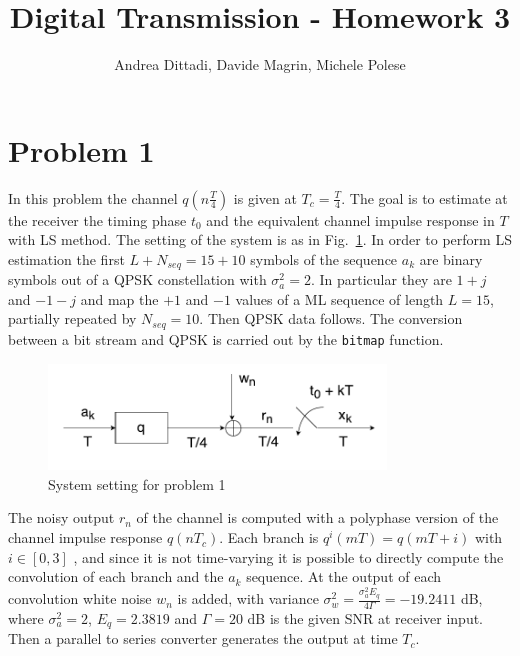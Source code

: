 \documentclass[10pt]{article}
\begin{document}
\title{Digital Transmission - Homework 3}
\author{Andrea Dittadi, Davide Magrin, Michele Polese}

\maketitle


\section*{Problem 1}

In this problem the channel $q(n\frac{T}{4})$ is given at $T_c = \frac{T}{4}$. The goal is to estimate at the receiver the timing phase $t_0$ and the equivalent channel impulse response in $T$ with LS method.
The setting of the system is as in Fig.~\ref{fig:channel_T4}. In order to perform LS estimation the first $L + N_{seq} = 15 + 10$ symbols of the sequence $a_k$ are binary symbols out of a QPSK constellation with $\sigma_a^2 = 2$. 
In particular they are $1+j$ and $-1-j$ and map the $+1$ and $-1$ values of a ML sequence of length $L = 15$, partially repeated by $N_{seq}=10$. Then QPSK data follows. 
The conversion between a bit stream and QPSK is carried out by the \texttt{bitmap} function. %

\begin{figure}
	\centering
	\includegraphics[width = 0.8\textwidth]{channel_T4}
	\caption{System setting for problem 1}
	\label{fig:channel_T4}
\end{figure}


The noisy output $r_n$ of the channel is computed with a polyphase version of the channel impulse response $q(nT_c)$. Each branch is $q^{i}(mT) = q(mT + i)$ with $i \in [0, 3]$ , and since it is not time-varying it is possible to directly compute the convolution of each branch and the $a_k$ sequence. At the output of each convolution white noise $w_n$ is added, with variance $\sigma_w^2 = \frac{\sigma_a^2 E_q}{4 \Gamma} = -19.2411$ dB, where $\sigma_a^2 = 2$, $E_q = 2.3819$ and $\Gamma = 20$ dB is the given SNR at receiver input. Then a parallel to series converter generates the output at time $T_c$.
\end{document}
